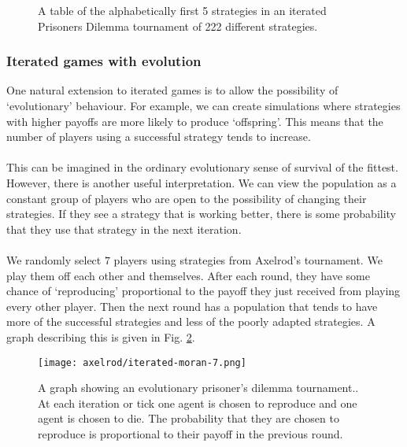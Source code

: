 \begin{figure}
\caption{A table of the alphabetically first 5 strategies in an iterated Prisoners Dilemma tournament of 222 different strategies.}
\label{fig:222}
\end{figure}
\subsubsection{Iterated games with evolution}
One natural extension to iterated games is to allow the possibility of `evolutionary' behaviour. For example, we can create simulations where strategies with higher payoffs are more likely to produce `offspring'. This means that the number of players using a successful strategy tends to increase.\\
\\
This can be imagined in the ordinary evolutionary sense of survival of the fittest. However, there is another useful interpretation. We can view the population as a constant group of players who are open to the possibility of changing their strategies. If they see a strategy that is working better, there is some probability that they use that strategy in the next iteration.\\
\\
We randomly select $7$ players using strategies from Axelrod's tournament. We play them off each other and themselves. After each round, they have some chance of `reproducing' proportional to the payoff they just received from playing every other player. Then the next round has a population that tends to have more of the successful strategies and less of the poorly adapted strategies. A graph describing this is given in Fig. \ref{fig:moran-100}.
\begin{figure}
	\centering
	\texttt{[image: axelrod/iterated-moran-7.png]}
	\caption{A graph showing an evolutionary prisoner's dilemma tournament.\label{mmd}. At each iteration or tick one agent is chosen to reproduce and one agent is chosen to die. The probability that they are chosen to reproduce is proportional to their payoff in the previous round.}
	\label{fig:moran-100}
\end{figure}
\\
